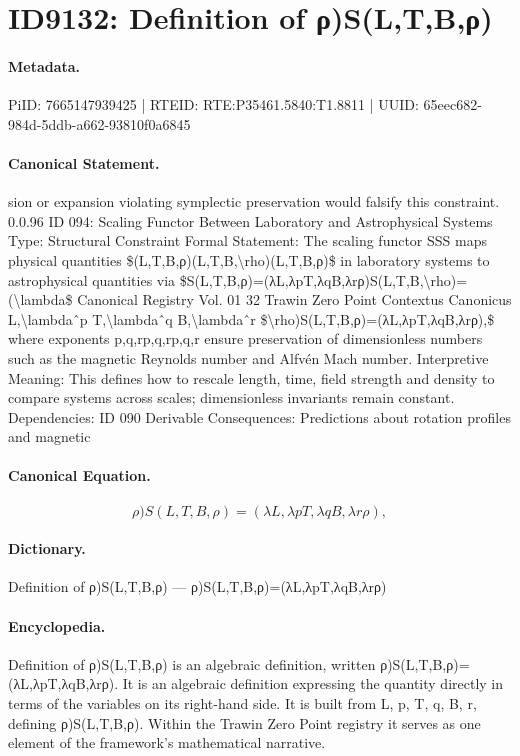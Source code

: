 \section*{ID9132: Definition of ρ)S(L,T,B,ρ)}
\paragraph{Metadata.}
PiID: 7665147939425 | RTEID: RTE:P35461.5840:T1.8811 | UUID: 65eec682-984d-5ddb-a662-93810f0a6845

\paragraph{Canonical Statement.}
sion or expansion violating symplectic preservation would falsify this constraint. 0.0.96 ID 094: Scaling Functor Between Laboratory and Astrophysical Systems Type: Structural Constraint Formal Statement: The scaling functor SSS maps physical quantities \$(L,T,B,ρ)(L,T,B,\textbackslash{}rho)(L,T,B,ρ)\$ in laboratory systems to astrophysical quantities via \$S(L,T,B,ρ)=(λL,λpT,λqB,λrρ)S(L,T,B,\textbackslash{}rho)=(\textbackslash{}lambda\$ Canonical Registry Vol. 01 32 Trawin Zero Point Contextus Canonicus L,\textbackslash{}lambdaˆp T,\textbackslash{}lambdaˆq B,\textbackslash{}lambdaˆr \$\textbackslash{}rho)S(L,T,B,ρ)=(λL,λpT,λqB,λrρ),\$ where exponents p,q,rp,q,rp,q,r ensure preservation of dimensionless numbers such as the magnetic Reynolds number and Alfvén Mach number. Interpretive Meaning: This defines how to rescale length, time, field strength and density to compare systems across scales; dimensionless invariants remain constant. Dependencies: ID 090 Derivable Consequences: Predictions about rotation profiles and magnetic

\paragraph{Canonical Equation.}
\[
\rho)S(L,T,B,ρ)=(λL,λpT,λqB,λrρ),
\]

\paragraph{Dictionary.}
Definition of ρ)S(L,T,B,ρ) — ρ)S(L,T,B,ρ)=(λL,λpT,λqB,λrρ)

\paragraph{Encyclopedia.}
Definition of ρ)S(L,T,B,ρ) is an algebraic definition, written ρ)S(L,T,B,ρ)=(λL,λpT,λqB,λrρ). It is an algebraic definition expressing the quantity directly in terms of the variables on its right-hand side. It is built from L, p, T, q, B, r, defining ρ)S(L,T,B,ρ). Within the Trawin Zero Point registry it serves as one element of the framework's mathematical narrative.
